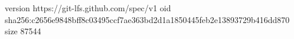 version https://git-lfs.github.com/spec/v1
oid sha256:c2656e9848bff8c03495ccf7ae363bd2d1a1850445feb2e13893729b416dd870
size 87544
